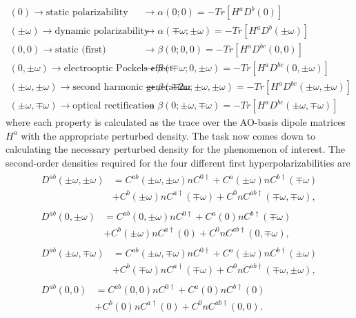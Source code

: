 \begin{align*}
  (0) \rightarrow \text{static polarizability} &\rightarrow \alpha(0;0) = -Tr[H^{a} D^{b}(0)] \tag{Karna IV-1a} \\
  (\pm\omega) \rightarrow \text{dynamic polarizability} &\rightarrow \alpha(\mp\omega;\pm\omega) = -Tr[H^{a} D^{b}(\pm\omega)] \tag{Karna IV-1b} \\
  (0,0) \rightarrow \text{static (first) hyperpolarizability} &\rightarrow \beta(0;0,0) = -Tr[H^{a} D^{bc}(0,0)] \tag{Karna IV-2a} \\
  (0,\pm\omega) \rightarrow \text{electrooptic Pockels effect (EOPE)} &\rightarrow \beta(\mp \omega;0,\pm\omega) = -Tr[H^{a} D^{bc}(0,\pm\omega)] \tag{Karna IV-2b} \\
  (\pm\omega,\pm\omega) \rightarrow \text{second harmonic generation (SHG)} &\rightarrow \beta(\mp 2\omega;\pm\omega,\pm\omega) = -Tr[H^{a} D^{bc}(\pm\omega,\pm\omega)] \tag{Karna IV-2c} \\
  (\pm\omega,\mp\omega) \rightarrow \text{optical rectification} &\rightarrow \beta(0;\pm\omega,\mp\omega) = -Tr[H^{a} D^{bc}(\pm\omega,\mp\omega)] \tag{Karna IV-2d}
\end{align*}
where each property is calculated as the trace over the AO-basis dipole matrices \(H^{a}\) with the appropriate perturbed density. The task now comes down to calculating the necessary perturbed density for the phenomenon of interest. The second-order densities required for the four different first hyperpolarizabilities are
\begin{align*}
  \begin{split}
    D^{ab}(\pm\omega,\pm\omega) &= C^{ab}(\pm\omega,\pm\omega) n C^{0\dagger} + C^{a}(\pm\omega) n C^{b\dagger}(\mp\omega) \\
    &+ C^{b}(\pm\omega) n C^{a\dagger}(\mp\omega) + C^{0} n C^{ab\dagger}(\mp\omega,\mp\omega),
  \end{split} \tag{Karna III-2a} \\
  \begin{split}
    D^{ab}(0,\pm\omega) &= C^{ab}(0,\pm\omega) n C^{0\dagger} + C^{a}(0) n C^{b\dagger}(\mp\omega) \\
    &+ C^{b}(\pm\omega) n C^{a\dagger}(0) + C^{0} n C^{ab\dagger}(0,\mp\omega),
  \end{split} \tag{Karna III-2b} \\
  \begin{split}
    D^{ab}(\pm\omega,\mp\omega) &= C^{ab}(\pm\omega,\mp\omega) n C^{0\dagger} + C^{a}(\pm\omega) n C^{b\dagger}(\pm\omega) \\
    &+ C^{b}(\mp\omega) n C^{a\dagger}(\mp\omega) + C^{0} n C^{ab\dagger}(\mp\omega,\pm\omega),
  \end{split} \tag{Karna III-2c} \\
  \begin{split}
    D^{ab}(0,0) &= C^{ab}(0,0) n C^{0\dagger} + C^{a}(0) n C^{b\dagger}(0) \\
    &+ C^{b}(0) n C^{a\dagger}(0) + C^{0} n C^{ab\dagger}(0,0).
  \end{split} \tag{Karna III-2d}
\end{align*}
